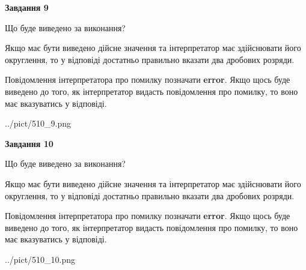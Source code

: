 \documentclass[12pt, ukrainian]{article}
\begin{document}
{\begin {Large}
{\begin {center}\textbf{Завдання 9}\end {center}}\par
Що буде виведено за виконання? \par

Якщо має бути виведено дійсне значення та інтерпретатор має здійснювати його округлення, 
то у відповіді достатньо правильно вказати два дробових розряди.

Повідомлення інтерпретатора про помилку позначати \textbf{error}.
Якщо щось буде виведено до того, як інтерпретатор видасть повідомлення про помилку, 
то воно має вказуватись у відповіді. \par

\begin{center}
	{../pict/510_9.png}
\end{center}
\newpage

{\begin {center}\textbf{Завдання 10}\end {center}}\par
Що буде виведено за виконання? \par

Якщо має бути виведено дійсне значення та інтерпретатор має здійснювати його округлення, 
то у відповіді достатньо правильно вказати два дробових розряди.

Повідомлення інтерпретатора про помилку позначати \textbf{error}.
Якщо щось буде виведено до того, як інтерпретатор видасть повідомлення про помилку, 
то воно має вказуватись у відповіді. \par

\begin{center}
	{../pict/510_10.png}
\end{center}
\newpage

\end {Large}}
\end{document}
